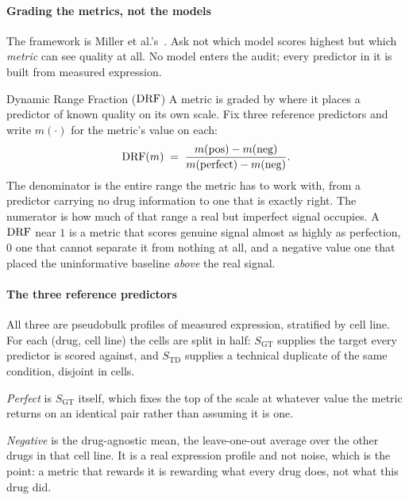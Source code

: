 \paragraph{Grading the metrics, not the models} The framework is Miller
et al.'s~\cite{miller}. Ask not which model scores highest but which
\emph{metric} can see quality at all. No model enters the audit; every predictor
in it is built from measured expression.

\begin{defn}{Dynamic Range Fraction ($\textrm{DRF}$)}
A metric is graded by where it places a predictor of known quality on its own
scale. Fix three reference predictors and write $m(\cdot)$ for the metric's value
on each:
\begin{equation}
 \DRF(m) \;=\; \frac{m(\textrm{pos}) - m(\textrm{neg})}%
 {m(\textrm{perfect}) - m(\textrm{neg})} .
\end{equation}
The denominator is the entire range the metric has to work with, from a predictor
carrying no drug information to one that is exactly right. The numerator is how
much of that range a real but imperfect signal occupies. A $\textrm{DRF}$ near $1$ is a
metric that scores genuine signal almost as highly as perfection, $0$ one that
cannot separate it from nothing at all, and a negative value one that placed the
uninformative baseline \emph{above} the real signal.
\end{defn}

\paragraph{The three reference predictors} All three are pseudobulk profiles of
measured expression, stratified by cell line. For each (drug, cell line) the
cells are split in half: $S_{\textrm{GT}}$ supplies the target every predictor is
scored against, and $S_{\textrm{TD}}$ supplies a technical duplicate of the same
condition, disjoint in cells.

\emph{Perfect} is $S_{\textrm{GT}}$ itself, which fixes the top of the scale at
whatever value the metric returns on an identical pair rather than assuming it is
one.

\emph{Negative} is the drug-agnostic mean, the leave-one-out average over the
other drugs in that cell line. It is a real expression profile and not noise,
which is the point: a metric that rewards it is rewarding what every drug does,
not what this drug did.

